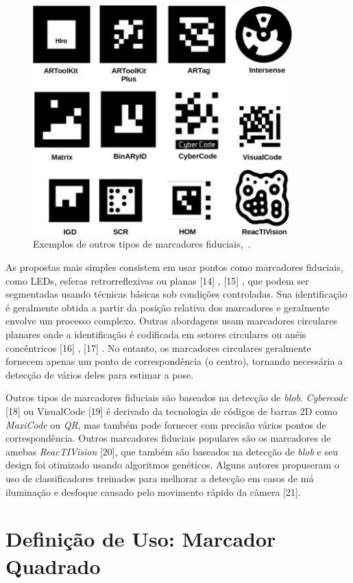 \begin{figure}[H]
	\centering
	\includegraphics[width=10cm, height=8 cm]{figuras/aruco-tipos.jpg}
	\caption{Exemplos de outros tipos de marcadores fiduciais,~\cite{Garrido2016}.}
	\label{fig:aruco-tipos}
\end{figure}

As propostas mais simples consistem em usar pontos como marcadores fiduciais, como LEDs, esferas retrorreflexivas ou planas [14] , [15] , que podem ser segmentadas usando técnicas básicas sob condições controladas. Sua identificação é geralmente obtida a partir da posição relativa dos marcadores e geralmente envolve um processo complexo. Outras abordagens usam marcadores circulares planares onde a identificação é codificada em setores circulares ou anéis concêntricos [16] , [17] . No entanto, os marcadores circulares geralmente fornecem apenas um ponto de correspondência (o centro), tornando necessária a detecção de vários deles para estimar a pose.

Outros tipos de marcadores fiduciais são baseados na detecção de \textit{blob}. \textit{Cybercode} [18] ou VisualCode [19] é derivado da tecnologia de códigos de barras 2D como \textit{MaxiCode} ou \textit{QR}, mas também pode fornecer com precisão vários pontos de correspondência. Outros marcadores fiduciais populares são os marcadores de amebas \textit{ReacTIVision} [20], que também são baseados na detecção de \textit{blob} e seu design foi otimizado usando algoritmos genéticos. Alguns autores propuseram o uso de classificadores treinados para melhorar a detecção em casos de má iluminação e desfoque causado pelo movimento rápido da câmera [21].

\section{Definição de Uso: Marcador Quadrado}

